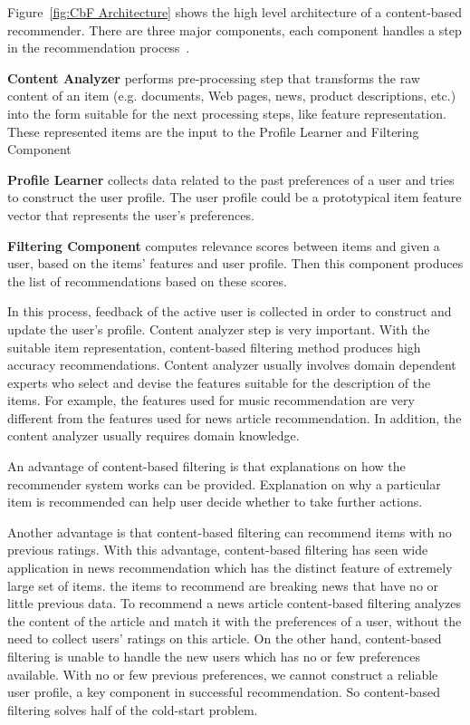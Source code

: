 \documentclass[oneside,13pt]{extreport}
\begin{document}
Figure~\ref{fig:CbF Architecture} shows the high level architecture of a content-based recommender. There are three major components, each component handles a step in the recommendation process~\cite{Lops11}.
\begin{description}
    \item{\textbf{Content Analyzer}} performs pre-processing step that transforms the raw content of an item (e.g. documents, Web pages, news, product descriptions, etc.) into the form suitable for the next processing steps, like feature representation. These represented items are the input to the Profile Learner and Filtering Component
    \item{\textbf{Profile Learner}} collects data related to the past preferences of a user and tries to construct the user profile. The user profile could be a prototypical item feature vector that represents the user’s preferences.
    \item{\textbf{Filtering Component}} computes relevance scores between items  and given a user, based on the items’ features and user profile. Then this component produces the list of recommendations based on these scores.
\end{description}    
    In this process, feedback of the active user is collected in order to construct and update the user's profile. Content analyzer step is very important. With the suitable item representation, content-based filtering method produces high accuracy recommendations. Content analyzer usually involves domain dependent experts who select and devise the
features suitable for the description of the items. For example, the features used for music recommendation are very different from the features used for news article recommendation. In addition, the content analyzer usually requires domain knowledge.

An advantage of content-based filtering is that explanations on how the recommender system works can be provided. Explanation on why a particular item is recommended can help user decide whether to take further actions. 

Another advantage is that content-based filtering can recommend items with no previous ratings. With this advantage, content-based filtering has seen wide application in news recommendation which has the distinct feature of extremely large set of items. the items to recommend are breaking news that have no or little previous data. To recommend a news article content-based filtering analyzes the content of the article and match it with the preferences of a user, without the need to collect users’ ratings on this article. On the other hand, content-based filtering is unable to handle the new users which has no or few preferences available. With no or few previous preferences, we cannot construct a reliable user profile, a key component in successful recommendation. So content-based filtering solves half of the cold-start problem.
\end{document}
